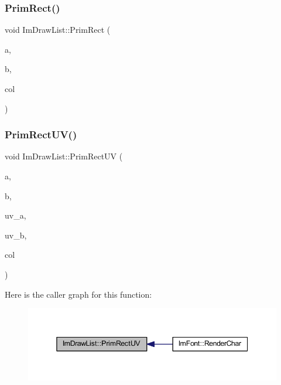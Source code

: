 \subsubsection{\texorpdfstring{Prim\+Rect()}{PrimRect()}}
{\footnotesize\ttfamily void Im\+Draw\+List\+::\+Prim\+Rect (\begin{DoxyParamCaption}\item[{const \mbox{\hyperlink{struct_im_vec2}{Im\+Vec2}} \&}]{a,  }\item[{const \mbox{\hyperlink{struct_im_vec2}{Im\+Vec2}} \&}]{b,  }\item[{\mbox{\hyperlink{imgui_8h_a118cff4eeb8d00e7d07ce3d6460eed36}{Im\+U32}}}]{col }\end{DoxyParamCaption})}

\mbox{\label{struct_im_draw_list_a77d48ed5b33ccdd908824c0a3bebfff8}} 
\subsubsection{\texorpdfstring{Prim\+Rect\+U\+V()}{PrimRectUV()}}
{\footnotesize\ttfamily void Im\+Draw\+List\+::\+Prim\+Rect\+UV (\begin{DoxyParamCaption}\item[{const \mbox{\hyperlink{struct_im_vec2}{Im\+Vec2}} \&}]{a,  }\item[{const \mbox{\hyperlink{struct_im_vec2}{Im\+Vec2}} \&}]{b,  }\item[{const \mbox{\hyperlink{struct_im_vec2}{Im\+Vec2}} \&}]{uv\+\_\+a,  }\item[{const \mbox{\hyperlink{struct_im_vec2}{Im\+Vec2}} \&}]{uv\+\_\+b,  }\item[{\mbox{\hyperlink{imgui_8h_a118cff4eeb8d00e7d07ce3d6460eed36}{Im\+U32}}}]{col }\end{DoxyParamCaption})}

Here is the caller graph for this function\+:
\nopagebreak
\begin{figure}[H]
\begin{center}
\leavevmode
\includegraphics[width=345pt]{struct_im_draw_list_a77d48ed5b33ccdd908824c0a3bebfff8_icgraph}
\end{center}
\end{figure}
\mbox{\label{struct_im_draw_list_a879aa38dbfb0344e3e023d65c002c7d7}} 
